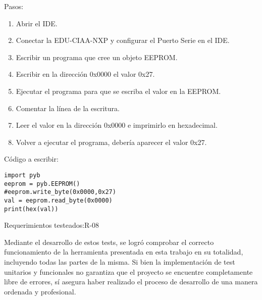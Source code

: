 Pasos:
\begin{enumerate}
	\item Abrir el IDE.
	\item Conectar la EDU-CIAA-NXP y configurar el Puerto Serie en el IDE.
	\item Escribir un programa que cree un objeto EEPROM.
	\item Escribir en la dirección 0x0000 el valor 0x27.
	\item Ejecutar el programa para que se escriba el valor en la EEPROM.
	\item Comentar la línea de la escritura.
	\item Leer el valor en la dirección 0x0000 e imprimirlo en hexadecimal.
	\item Volver a ejecutar el programa, debería aparecer el valor 0x27.
\end{enumerate}

Código a escribir:

\begin{verbatim}
import pyb
eeprom = pyb.EEPROM()
#eeprom.write_byte(0x0000,0x27)
val = eeprom.read_byte(0x0000)
print(hex(val))
\end{verbatim}

Requerimientos testeados:R-08


Mediante el desarrollo de estos tests, se logró comprobar el correcto funcionamiento de la herramienta presentada en esta trabajo en su totalidad, incluyendo todas las partes de la misma. Si bien la implementación de test unitarios y funcionales no garantiza que el proyecto se encuentre completamente libre de errores, sí asegura haber realizado el proceso de desarrollo de una manera ordenada y profesional.
